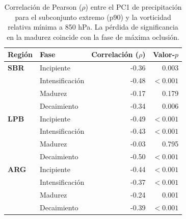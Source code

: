 \begin{table}[htbp]
\centering
\caption[Correlación de Pearson entre PC1 y vorticidad - p90]{Correlación de Pearson ($\rho$) entre el PC1 de precipitación para el subconjunto extremo (p90) y la vorticidad relativa mínima a 850 hPa. La pérdida de significancia en la madurez coincide con la fase de máxima oclusión.}
\label{tab:corr_p90_tp}
\begin{tabular*}{\textwidth}{@{\extracolsep{\fill}}llrr}
\hline
\textbf{Región} & \textbf{Fase} & \textbf{Correlación ($\rho$)} & \textbf{Valor-$p$} \\
\hline
\textbf{SBR} & Incipiente & -0.36 & 0.003 \\
 & Intensificación & -0.48 & $<0.001$ \\
 & Madurez & -0.17 & 0.179 \\
 & Decaimiento & -0.34 & 0.006 \\
\hline
\textbf{LPB} & Incipiente & -0.49 & $<0.001$ \\
 & Intensificación & -0.43 & $<0.001$ \\
 & Madurez & -0.03 & 0.795 \\
 & Decaimiento & -0.50 & $<0.001$ \\
\hline
\textbf{ARG} & Incipiente & -0.44 & $<0.001$ \\
 & Intensificación & -0.37 & $<0.001$ \\
 & Madurez & -0.24 & 0.001 \\
 & Decaimiento & -0.39 & $<0.001$ \\
\hline
\end{tabular*}
\end{table}
